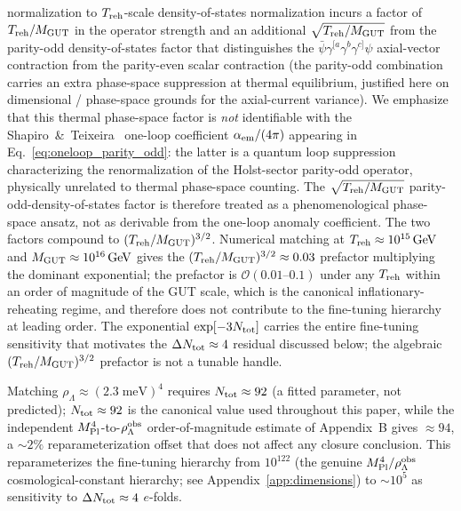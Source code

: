 \documentclass[aps,prd,twocolumn,superscriptaddress,showpacs,preprintnumbers,nofootinbib,longbibliography,floatfix]{revtex4-2}
\newcommand{\MPl}{M_{\rm Pl}}
\begin{document}
normalization to $T_{\rm reh}$-scale density-of-states normalization
incurs a factor of $T_{\rm reh}/M_{\rm GUT}$ in the operator
strength and an additional $\sqrt{T_{\rm reh}/M_{\rm GUT}}$ from the
parity-odd density-of-states factor that distinguishes the
$\bar\psi \gamma^{[a}\gamma^b\gamma^{c]}\psi$ axial-vector
contraction from the parity-even scalar contraction (the parity-odd
combination carries an extra phase-space suppression at thermal
equilibrium, justified here on dimensional / phase-space grounds for
the axial-current variance). We emphasize that this thermal
phase-space factor is \emph{not} identifiable with the
Shapiro~\&~Teixeira~\cite{ShapiroTeixeira2014} one-loop
coefficient $\alpha_{\rm em}/(4\pi)$ appearing in
Eq.~\ref{eq:oneloop_parity_odd}: the latter is a quantum
loop suppression characterizing the renormalization of the
Holst-sector parity-odd operator, physically unrelated to thermal
phase-space counting. The $\sqrt{T_{\rm reh}/M_{\rm GUT}}$
parity-odd-density-of-states factor is therefore treated as a
phenomenological phase-space ansatz, not as derivable from the
one-loop anomaly coefficient. The
two factors compound to $(T_{\rm reh}/M_{\rm GUT})^{3/2}$. Numerical
matching at $T_{\rm reh} \approx 10^{15}\,\text{GeV}$ and
$M_{\rm GUT} \approx 10^{16}\,\text{GeV}$ gives the
$(T_{\rm reh}/M_{\rm GUT})^{3/2} \approx 0.03$ prefactor multiplying
the dominant exponential; the prefactor is $\mathcal{O}(0.01\text{--}0.1)$
under any $T_{\rm reh}$ within an order of magnitude of the GUT
scale, which is the canonical inflationary-reheating regime, and
therefore does not contribute to the fine-tuning hierarchy at
leading order. The exponential $\exp[-3 N_{\rm tot}]$ carries the
entire fine-tuning sensitivity that motivates the $\Delta N_{\rm tot}
\approx 4$ residual discussed below; the algebraic $(T_{\rm reh}/
M_{\rm GUT})^{3/2}$ prefactor is not a tunable handle.

Matching $\rho_\Lambda \approx (2.3\;\text{meV})^4$ requires $N_{\rm tot} \approx 92$
(a fitted parameter, not predicted); $N_{\rm tot}\approx 92$ is the
canonical value used throughout this paper, while the independent
$\MPl^4$-to-$\rho_\Lambda^{\rm obs}$ order-of-magnitude estimate of
Appendix~B gives $\approx 94$, a ${\sim}2\%$ reparameterization offset
that does not affect any closure conclusion. This reparameterizes the fine-tuning hierarchy
from $10^{122}$ (the genuine $\MPl^4/\rho_\Lambda^{\rm obs}$ cosmological-constant
hierarchy; see Appendix~\ref{app:dimensions}) to $\sim 10^5$ as sensitivity to
$\Delta N_{\rm tot}\approx 4$ $e$-folds.
\end{document}
